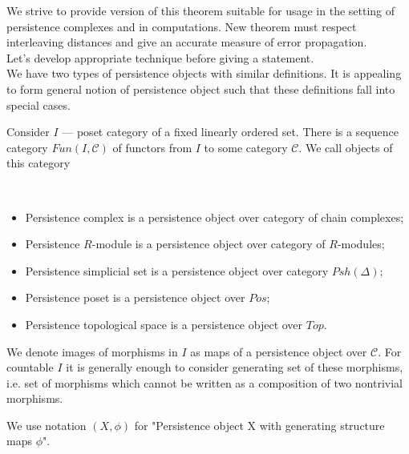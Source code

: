 We strive to provide version of this theorem suitable for usage in the setting of persistence complexes and in computations. New theorem must respect interleaving distances and give an accurate measure of error propagation.\\
Let's develop appropriate technique before giving a statement.\\

We have two types of persistence objects with similar definitions. It is appealing to form general notion of persistence object such that these definitions fall into special cases.\\

\begin{definition}
  Consider $I$ --- poset category of a fixed linearly ordered set. There is a sequence category $Fun(I, \mathcal{C})$ of functors from $I$ to some category $\mathcal{C}$. We call objects of this category 
\end{definition}

\begin{example} ~ \par
  \begin{itemize}
    \item Persistence complex is a persistence object over category of chain complexes;
    \item Persistence $R$-module is a persistence object over category of $R$-modules;
    \item Persistence simplicial set is a persistence object over category $Psh(\Delta)$;
    \item Persistence poset is a persistence object over $Pos$;
    \item Persistence topological space is a persistence object over $Top$.
  \end{itemize}
\end{example}

\begin{definition}
  We denote images of morphisms in $I$ as  maps of a persistence object over $\mathcal{C}$. For countable $I$ it is generally enough to consider generating set of these morphisms, i.e. set of morphisms which cannot be written as a composition of two nontrivial morphisms.
\end{definition}

We use notation $(X,\phi)$ for "Persistence object X with generating structure maps $\phi$".\\

